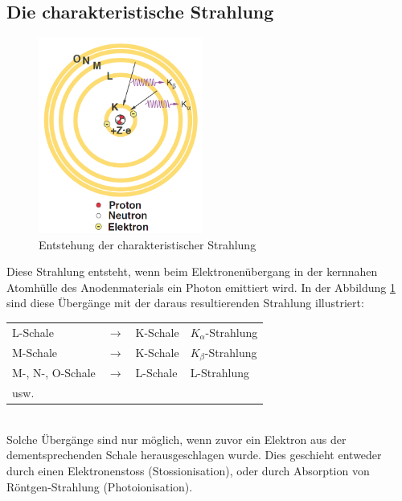 \subsection{Die charakteristische Strahlung}
\begin{figure}
\centering
\includegraphics[width=0.48\textwidth]{Bilder/atommodell.png} 
\caption{Entstehung der charakteristischer Strahlung}
\vspace{-6cm}
\label{fig:charStrahlung}
\end{figure}
Diese Strahlung entsteht, wenn beim Elektronenübergang in der kernnahen Atomhülle des Anodenmaterials ein Photon emittiert wird. In der Abbildung \ref{fig:charStrahlung} sind diese Übergänge mit der daraus resultierenden Strahlung illustriert:
\\[0.5cm]
\begin{tabular}{llll}
L-Schale & $\rightarrow$ & K-Schale & $K_{\alpha}$-Strahlung \\ 
M-Schale & $\rightarrow$ & K-Schale & $K_{\beta}$-Strahlung \\ 
M-, N-, O-Schale & $\rightarrow$ & L-Schale & L-Strahlung \\ 
\multicolumn{4}{l}{usw.} \\ 
\end{tabular}
\\[0.5cm]
Solche Übergänge sind nur möglich, wenn zuvor ein Elektron aus der dementsprechenden Schale \glqq herausgeschlagen\grqq\; wurde. Dies geschieht entweder durch einen Elektronenstoss (Stossionisation), oder durch Absorption von Röntgen-Strahlung (Photoionisation).\\
\vspace*{3cm}

